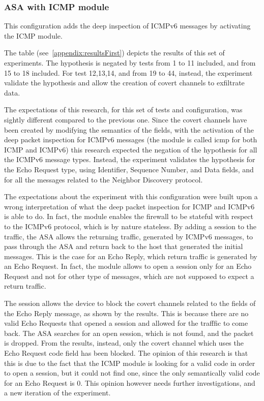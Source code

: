 \documentclass[12pt]{article}
\begin{document}
\subsubsection{ASA with ICMP module}
\label{resultsFirstASADefaultICMP}

This configuration adds the deep inspection of ICMPv6 messages by activating the ICMP module.

The table (see~\ref{appendix:resultsFirst}) depicts the results of this set of experiments. The hypothesis is negated by tests from 1 to 11 included, and from 15 to 18 included. For test 12,13,14, and from 19 to 44, instead, the experiment validate the hypothesis and allow the creation of covert channels to exfiltrate data.

The expectations of this research, for this set of tests and configuration, was sightly different compared to the previous one. Since the covert channels have been created by modifying the semantics of the fields, with the activation of the deep packet inspection for ICMPv6 messages (the module is called icmp for both ICMP and ICMPv6) this research expected the negation of the hypothesis for all the ICMPv6 message types. Instead, the experiment validates the hypothesis for the Echo Request type, using Identifier, Sequence Number, and Data fields, and for all the messages related to the Neighbor Discovery protocol.

The expectations about the experiment with this configuration were built upon a wrong interpretation of what the deep packet inspection for ICMP and ICMPv6 is able to do. In fact, the module enables the firewall to be stateful with respect to the ICMPv6 protocol, which is by nature stateless. By adding a session to the traffic, the ASA allows the returning traffic, generated by ICMPv6 messages, to pass through the ASA and return back to the host that generated the initial messages. This is the case for an Echo Reply, which return traffic is generated by an Echo Request. In fact, the module allows to open a session only for an Echo Request and not for other type of messages, which are not supposed to expect a return traffic.

The session allows the device to block the covert channels related to the fields of the Echo Reply message, as shown by the results. This is because there are no valid Echo Requests that opened a session and allowed for the trafffic to come back. The ASA searches for an open session, which is not found, and the packet is dropped. From the results, instead, only the covert channel which uses the Echo Request code field has been blocked. The opinion of this research is that this is due to the fact that the ICMP module is looking for a valid code in order to open a session, but it could not find one, since the only semantically valid code for an Echo Request is 0. This opinion however needs further investigations, and a new iteration of the experiment. 
\end{document}
